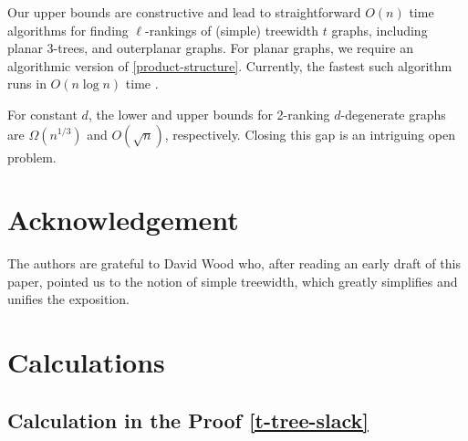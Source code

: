 \documentclass[kpfonts]{patmorin}
\theoremstyle{named}
\begin{document}
Our upper bounds are constructive and lead to straightforward $O(n)$ time algorithms for finding $\ell$-rankings of (simple) treewidth $t$ graphs, including planar 3-trees, and outerplanar graphs.  For planar graphs, we require an algorithmic version of \cref{product-structure}. Currently, the fastest such algorithm runs in $O(n\log n)$ time \cite{morin:fast}.

For constant $d$, the lower and upper bounds for 2-ranking $d$-degenerate graphs are $\Omega(n^{1/3})$ and $O(\sqrt{n})$, respectively.  Closing this gap is an intriguing open problem.

\section*{Acknowledgement}

The authors are grateful to David Wood who, after reading an early draft of this paper, pointed us to the notion of simple treewidth, which greatly simplifies and unifies the exposition.





\appendix
\section{Calculations}
\label{calculation}

\subsection{Calculation in the Proof \cref{t-tree-slack}}
\label{calculation-i}
\end{document}
